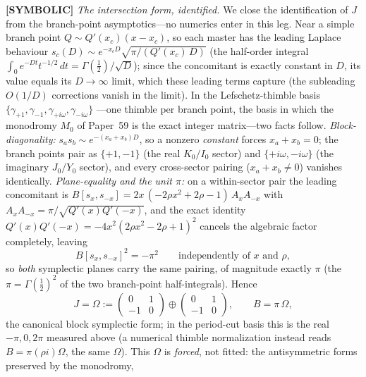 \documentclass[aps,pra,twocolumn,superscriptaddress,longbibliography]{revtex4-2}
\begin{document}
\textbf{[SYMBOLIC]} \emph{The intersection form, identified.}  We close the
identification of $J$ from the branch-point asymptotics---no numerics enter
in this leg.  Near a
simple branch point $Q\sim Q'(x_{c})(x-x_{c})$, so each master has the leading Laplace
behaviour $s_{c}(D)\sim e^{-x_{c}D}\sqrt{\pi/(Q'(x_{c})\,D)}$ (the half-order integral
$\int_{0}e^{-Dt}t^{-1/2}\,dt=\Gamma(\tfrac12)/\sqrt D$); since the concomitant is exactly
constant in $D$, its value equals its $D\to\infty$ limit, which these leading terms
capture (the subleading $O(1/D)$ corrections vanish in the limit).  In the
Lefschetz-thimble basis $\{\gamma_{+1},\gamma_{-1},\gamma_{+i\omega},\gamma_{-i\omega}\}$
---one thimble per branch point, the basis in which the monodromy $M_{0}$ of
Paper~59 is the exact integer matrix---two facts follow.
\emph{Block-diagonality:} $s_{a}s_{b}\sim e^{-(x_{a}+x_{b})D}$, so a nonzero
\emph{constant} forces $x_{a}+x_{b}=0$; the branch points pair as $\{+1,-1\}$ (the real
$K_{0}/I_{0}$ sector) and $\{+i\omega,-i\omega\}$ (the imaginary $J_{0}/Y_{0}$ sector),
and every cross-sector pairing ($x_{a}+x_{b}\neq0$) vanishes identically.
\emph{Plane-equality and the unit $\pi$:} on a within-sector pair the leading concomitant
is $B[s_{x},s_{-x}]=2x\,(-2\rho x^{2}+2\rho-1)\,A_{x}A_{-x}$ with
$A_{x}A_{-x}=\pi/\sqrt{Q'(x)Q'(-x)}$, and the exact identity
$Q'(x)Q'(-x)=-4x^{2}(2\rho x^{2}-2\rho+1)^{2}$ cancels the algebraic factor completely,
leaving
%
\begin{equation}
B[s_{x},s_{-x}]^{2}=-\pi^{2}\qquad\text{independently of }x\text{ and }\rho,
\label{eq:planepi}
\end{equation}
%
so \emph{both} symplectic planes carry the same pairing, of magnitude exactly $\pi$ (the
$\pi=\Gamma(\tfrac12)^{2}$ of the two branch-point half-integrals).  Hence
%
\begin{equation}
J=\Omega:=\begin{pmatrix}0&1\\-1&0\end{pmatrix}\oplus
\begin{pmatrix}0&1\\-1&0\end{pmatrix},
\qquad B=\pi\,\Omega ,
\end{equation}
%
the canonical block symplectic form; in the period-cut basis this is the real
$-\pi,0,2\pi$ measured above (a numerical thimble normalization instead reads
$B=\pi(\rho i)\Omega$, the same $\Omega$).  This $\Omega$
is \emph{forced}, not fitted: the antisymmetric forms preserved by the monodromy,
\end{document}
